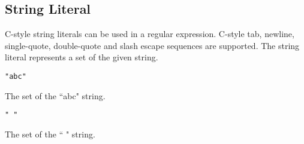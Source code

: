 
\subsection{String Literal}
{
	C-style string literals can be used in a regular expression.
	C-style tab, newline, single-quote, double-quote and slash escape sequences
	are supported.
	The string literal represents a set of the given string.
	
	\begin{itemize}
	{
		\item[] \lstinline[language=MAIA, columns=fixed]@"abc"@
		
			The set of the ``abc" string.
		
		\item[] \lstinline[language=MAIA, columns=fixed]@" "@
		
			The set of the `` " string.
	}
	\end{itemize}
}
